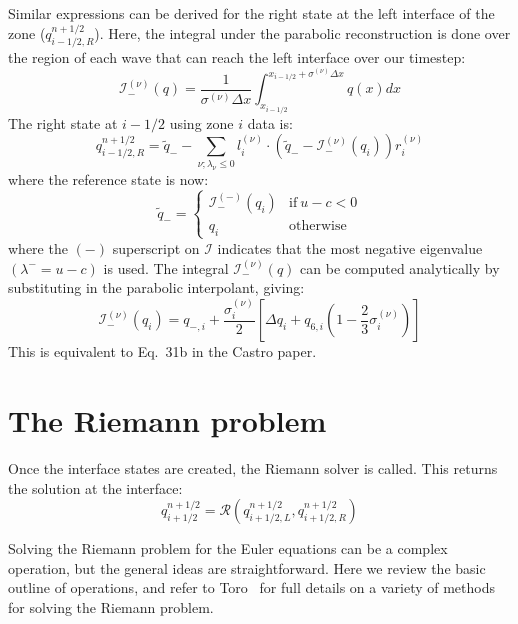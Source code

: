 \documentclass[11pt]{article}
\begin{document}
Similar expressions can be derived for the right state at the left interface
of the zone ($q_{i-1/2,R}^{n+1/2}$).  Here, the integral under the parabolic
reconstruction is done over the region of each wave that can reach the left 
interface over our timestep:
\begin{equation}
\mathcal{I}_-^{(\nu)}(q) = \frac{1}{\sigma^{(\nu)} \Delta x}
  \int_{x_{i-1/2}}^{x_{i-1/2} + \sigma^{(\nu)} \Delta x} q(x) dx
\end{equation}
The right state at $i-1/2$ using zone $i$ data is:
\begin{equation}
q_{i-1/2,R}^{n+1/2} = \tilde{q}_- - \sum_{\nu; \lambda_\nu \le 0}
   l_i^{(\nu)} \cdot \left ( \tilde{q}_- - \mathcal{I}_-^{(\nu)}(q_i) \right ) r_i^{(\nu)}
\end{equation}
where the reference state is now:
\begin{equation}
\tilde{q}_- = \left \{ \begin{array}{cc}
   \mathcal{I}_-^{(-)}(q_i) & \mathrm{if~} u - c < 0 \\
    q_i                   & \mathrm{otherwise}
\end{array} \right .
\end{equation}
where the $(-)$ superscript on $\mathcal{I}$ indicates that the most
negative eigenvalue $(\lambda^- = u - c)$ is used.  The integral
$\mathcal{I}_-^{(\nu)}(q)$ can be computed analytically by
substituting in the parabolic interpolant, giving:
\begin{equation}
\mathcal{I}_-^{(\nu)}(q_i) = q_{-,i} + \frac{\sigma_i^{(\nu)}}{2}
   \left [ \Delta q_i + q_{6,i} \left ( 1 - \frac{2}{3} \sigma_i^{(\nu)} \right ) \right ]
\end{equation}
This is equivalent to Eq.~31b in the Castro paper.

\section{The Riemann problem}

Once the interface states are created, the Riemann solver is called.  This 
returns the solution at the interface:
\begin{equation}
q_{i+1/2}^{n+1/2} = \mathcal{R}(q_{i+1/2,L}^{n+1/2}, q_{i+1/2,R}^{n+1/2})
\end{equation}

Solving the Riemann problem for the Euler equations can be a complex
operation, but the general ideas are straightforward.  Here we review
the basic outline of operations, and refer to Toro~\cite{toro:1997} for
full details on a variety of methods for solving the Riemann problem.
\end{document}
